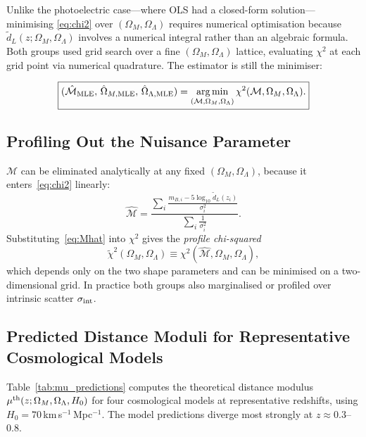 \documentclass[12pt]{article}
\begin{document}
Unlike the photoelectric case---where OLS had a closed-form solution---
minimising \eqref{eq:chi2} over $(\Omega_M, \Omega_\Lambda)$ requires
numerical optimisation because $\tilde d_L(z;\Omega_M,\Omega_\Lambda)$
involves a numerical integral rather than an algebraic formula.  Both
groups used grid search over a fine $(\Omega_M, \Omega_\Lambda)$ lattice,
evaluating $\chi^2$ at each grid point via numerical quadrature.
The estimator is still the minimiser:

\begin{equation}\label{eq:mle_wls}
  \boxed{(\hat{\mathcal{M}}_{\rm MLE},\,\hat\Omega_{M,\rm MLE},\,
    \hat\Omega_{\Lambda,\rm MLE})
  = \operatornamewithlimits{arg\,min}_{(\mathcal{M},\Omega_M,\Omega_\Lambda)}
    \chi^2(\mathcal{M},\Omega_M,\Omega_\Lambda).}
\end{equation}

\subsection{Profiling Out the Nuisance Parameter}

$\mathcal{M}$ can be eliminated analytically at any fixed
$(\Omega_M,\Omega_\Lambda)$, because it enters~\eqref{eq:chi2} linearly:
\begin{equation}\label{eq:Mhat}
  \hat{\mathcal{M}} =
  \frac{\displaystyle\sum_i \frac{m_{B,i} - 5\log_{10}\tilde d_L(z_i)}
    {\sigma_i^2}}
  {\displaystyle\sum_i \frac{1}{\sigma_i^2}}.
\end{equation}
Substituting~\eqref{eq:Mhat} into $\chi^2$ gives the
\emph{profile chi-squared}
\begin{equation}\label{eq:chi2_profile}
  \tilde\chi^2(\Omega_M,\Omega_\Lambda) \equiv
  \chi^2(\hat{\mathcal{M}},\Omega_M,\Omega_\Lambda),
\end{equation}
which depends only on the two shape parameters and can be minimised on a
two-dimensional grid.  In practice both groups also marginalised or
profiled over intrinsic scatter $\sigma_{\rm int}$.

\subsection{Predicted Distance Moduli for Representative Cosmological Models}

Table~\ref{tab:mu_predictions} computes the theoretical distance modulus
$\mu^{\rm th}(z;\Omega_M,\Omega_\Lambda,H_0)$ for four cosmological models
at representative redshifts, using $H_0 = 70$\,km\,s$^{-1}$\,Mpc$^{-1}$.
The model predictions diverge most strongly at $z \approx 0.3$--$0.8$.
\end{document}
